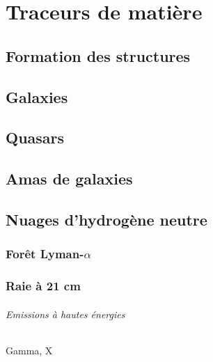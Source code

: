 
\chapter{Traceurs de matière} %

\label{Chapter3} %


\section{Formation des structures}

\section{Galaxies}

\section{Quasars}

\section{Amas de galaxies}

\section{Nuages d'hydrogène neutre}
\subsection{Forêt Lyman-$\alpha$}
\subsection{Raie à 21 cm}

\subparagraph{Emissions à hautes énergies}
Gamma, X
